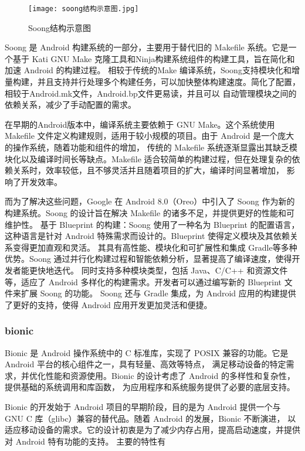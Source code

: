 \begin{figure}[h]
  \centering
  \texttt{[image: soong结构示意图.jpg]}
  \caption{Soong结构示意图}
\end{figure}

Soong 是 Android 构建系统的一部分，主要用于替代旧的 Makefile 系统。它是一个基于 Kati GNU Make 克隆工具和Ninja构建系统组件的构建工具，旨在简化和加速 Android 的构建过程。
相较于传统的Make 编译系统，Soong支持模块化和增量构建，并且支持并行处理多个构建任务，可以加快整体构建速度。简化了配置，相较于Android.mk文件，Android.bp文件更易读，并且可以
自动管理模块之间的依赖关系，减少了手动配置的需求。

在早期的Android版本中，编译系统主要依赖于 GNU Make。这个系统使用 Makefile 文件定义构建规则，适用于较小规模的项目。由于 Android 是一个庞大的操作系统，随着功能和组件的增加，
传统的 Makefile 系统逐渐显露出其缺乏模块化以及编译时间长等缺点。Makefile 适合较简单的构建过程，但在处理复杂的依赖关系时，效率较低，且不够灵活并且随着项目的扩大，编译时间显著增加，
影响了开发效率。

而为了解决这些问题，Google 在 Android 8.0（Oreo）中引入了 Soong 作为新的构建系统。Soong 的设计旨在解决 Makefile 的诸多不足，并提供更好的性能和可维护性。
基于 Blueprint 的构建：Soong 使用了一种名为 Blueprint 的配置语言，这种语言是针对 Android 特殊需求而设计的。Blueprint 使得定义模块及其依赖关系变得更加直观和灵活。
其具有高性能、模块化和可扩展性和集成 Gradle等多种优势。Soong 通过并行化构建过程和智能依赖分析，显著提高了编译速度，使得开发者能更快地迭代。
同时支持多种模块类型，包括 Java、C/C++ 和资源文件等，适应了 Android 多样化的构建需求。开发者可以通过编写新的 Blueprint 文件来扩展 Soong 的功能。
Soong 还与 Gradle 集成，为 Android 应用的构建提供了更好的支持，使得 Android 应用开发更加灵活和便捷。

\subsubsection{bionic}

Bionic 是 Android 操作系统中的 C 标准库，实现了 POSIX 兼容的功能。它是 Android 平台的核心组件之一，具有轻量、高效等特点，
满足移动设备的特定需求，并优化性能和资源使用。Bionic 的设计考虑了 Android 的多样性和复杂性，提供基础的系统调用和库函数，
为应用程序和系统服务提供了必要的底层支持。

Bionic 的开发始于 Android 项目的早期阶段，目的是为 Android 提供一个与 GNU C 库（glibc）兼容的替代品。随着 Android 的发展，Bionic 不断演进，
以适应移动设备的需求。它的设计初衷是为了减少内存占用，提高启动速度，并提供对 Android 特有功能的支持。
主要的特性有

